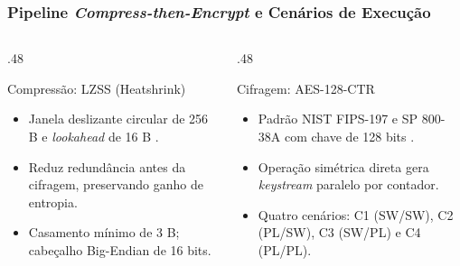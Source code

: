\begin{frame}
  \frametitle{Pipeline \textit{Compress-then-Encrypt} e Cen\'arios de Execu\c{c}\~ao}
  \begin{columns}[T]
    \begin{column}{.48\textwidth}
      \begin{block}{Compress\~ao: LZSS (Heatshrink)}
        \begin{itemize}
          \item Janela deslizante circular de 256 B e \textit{lookahead} de 16 B \autocite{Heatshrink}.
          \item Reduz redund\^ancia antes da cifragem, preservando ganho de entropia.
          \item Casamento m\'inimo de 3 B; cabe\c{c}alho Big-Endian de 16 bits.
        \end{itemize}
      \end{block}
    \end{column}
    \begin{column}{.48\textwidth}
      \begin{block}{Cifragem: AES-128-CTR}
        \begin{itemize}
          \item Padr\~ao NIST FIPS-197 e SP 800-38A com chave de 128 bits \autocite{NISTFIPS197,NISTSP80038A}.
          \item Opera\c{c}\~ao sim\'etrica direta gera \textit{keystream} paralelo por contador.
          \item Quatro cen\'arios: C1 (SW/SW), C2 (PL/SW), C3 (SW/PL) e C4 (PL/PL).
        \end{itemize}
      \end{block}
    \end{column}
  \end{columns}
\end{frame}
